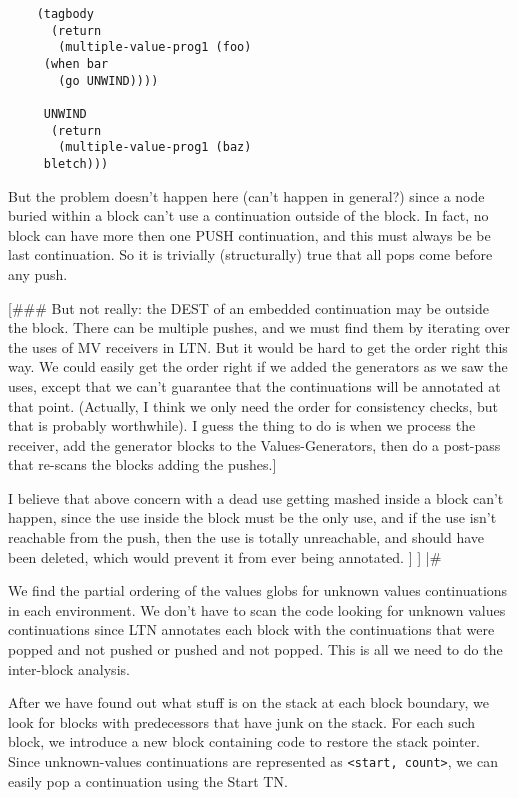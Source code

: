 \begin{verbatim}
    (tagbody
      (return
       (multiple-value-prog1 (foo)
	 (when bar
	   (go UNWIND))))

     UNWIND
      (return
       (multiple-value-prog1 (baz)
	 bletch)))
\end{verbatim}

But the problem doesn't happen here (can't happen in general?) since a node
buried within a block can't use a continuation outside of the block.  In fact,
no block can have more then one PUSH continuation, and this must always be be
last continuation.  So it is trivially (structurally) true that all pops come
before any push.

[\#\#\# But not really: the DEST of an embedded continuation may be outside the
block.  There can be multiple pushes, and we must find them by iterating over
the uses of MV receivers in LTN.  But it would be hard to get the order right
this way.  We could easily get the order right if we added the generators as we
saw the uses, except that we can't guarantee that the continuations will be
annotated at that point.  (Actually, I think we only need the order for
consistency checks, but that is probably worthwhile).  I guess the thing to do
is when we process the receiver, add the generator blocks to the
Values-Generators, then do a post-pass that re-scans the blocks adding the
pushes.]

I believe that above concern with a dead use getting mashed inside a block
can't happen, since the use inside the block must be the only use, and if the
use isn't reachable from the push, then the use is totally unreachable, and
should have been deleted, which would prevent it from ever being
annotated.
]
]
|\#

We find the partial ordering of the values globs for unknown values
continuations in each environment.  We don't have to scan the code looking for
unknown values continuations since LTN annotates each block with the
continuations that were popped and not pushed or pushed and not popped.  This
is all we need to do the inter-block analysis.

After we have found out what stuff is on the stack at each block boundary, we
look for blocks with predecessors that have junk on the stack.  For each such
block, we introduce a new block containing code to restore the stack pointer.
Since unknown-values continuations are represented as \verb+<start, count>+, we can
easily pop a continuation using the Start TN.

